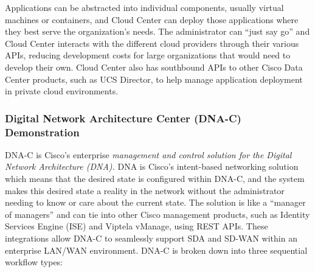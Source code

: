 Applications can be abstracted into individual components, usually virtual
machines or containers, and Cloud Center can deploy those applications where
they best serve the organization's needs. The administrator can ``just say go''
and Cloud Center interacts with the different cloud providers through their
various APIs, reducing development costs for large organizations that would
need to develop their own. Cloud Center also has southbound APIs to other
Cisco Data Center products, such as UCS Director, to help manage application
deployment in private cloud environments.

\subsubsection{Digital Network Architecture Center (DNA-C) Demonstration}
DNA-C is Cisco's enterprise \textit{management and control solution for the Digital
Network Architecture (DNA).} DNA is Cisco's intent-based networking solution
which means that the desired state is configured within DNA-C, and the system
makes this desired state a reality in the network without the administrator
needing to know or care about the current state. The solution is like a
``manager of managers'' and can tie into other Cisco management products, such
as Identity Services Engine (ISE) and Viptela vManage, using REST APIs. These
integrations allow DNA-C to seamlessly support SDA and SD-WAN within an
enterprise LAN/WAN environment. DNA-C is broken down into three sequential
workflow types:

